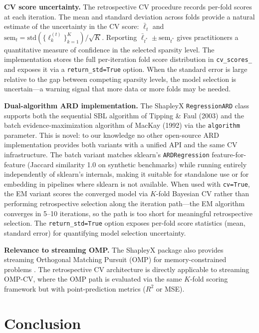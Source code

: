 \documentclass[11pt,a4paper]{article}
\begin{document}
\textbf{CV score uncertainty.} The retrospective CV procedure records per-fold scores at each iteration.  The mean and standard deviation across folds provide a natural estimate of the uncertainty in the CV score: $\bar{\ell}_t$ and $\text{sem}_t = \text{std}(\{\ell_k^{(t)}\}_{k=1}^K) / \sqrt{K}$.  Reporting $\bar{\ell}_{t^*} \pm \text{sem}_{t^*}$ gives practitioners a quantitative measure of confidence in the selected sparsity level.  The implementation stores the full per-iteration fold score distribution in \texttt{cv\_scores\_} and exposes it via a \texttt{return\_std=True} option.  When the standard error is large relative to the gap between competing sparsity levels, the model selection is uncertain---a warning signal that more data or more folds may be needed.

\textbf{Dual-algorithm ARD implementation.} The ShapleyX \texttt{RegressionARD} class supports both the sequential SBL algorithm of Tipping \& Faul (2003) and the batch evidence-maximization algorithm of MacKay (1992) via the \texttt{algorithm} parameter.  This is novel: to our knowledge no other open-source ARD implementation provides both variants with a unified API and the same CV infrastructure.  The batch variant matches sklearn's \texttt{ARDRegression} feature-for-feature (Jaccard similarity 1.0 on synthetic benchmarks) while running entirely independently of sklearn's internals, making it suitable for standalone use or for embedding in pipelines where sklearn is not available.  When used with \texttt{cv=True}, the EM variant scores the converged model via $K$-fold Bayesian CV rather than performing retrospective selection along the iteration path---the EM algorithm converges in 5--10 iterations, so the path is too short for meaningful retrospective selection.  The \texttt{return\_std=True} option exposes per-fold score statistics (mean, standard error) for quantifying model selection uncertainty.

\textbf{Relevance to streaming OMP.} The ShapleyX package also provides streaming Orthogonal Matching Pursuit (OMP) for memory-constrained problems \citep{bennett2026}. The retrospective CV architecture is directly applicable to streaming OMP-CV, where the OMP path is evaluated via the same $K$-fold scoring framework but with point-prediction metrics ($R^2$ or MSE).

\section{Conclusion}
\end{document}
